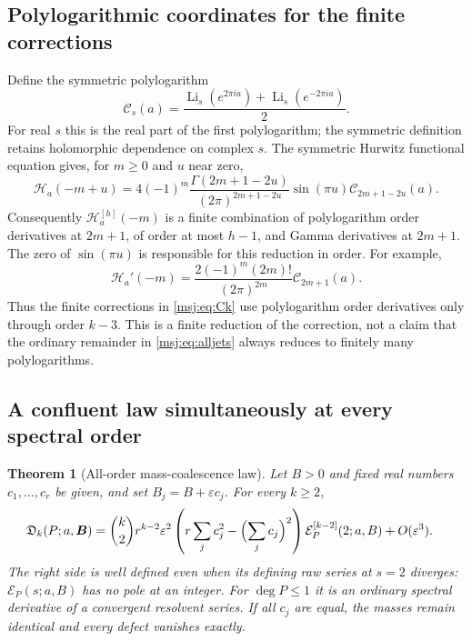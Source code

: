 \documentclass[11pt,a4paper]{article}
\numberwithin{equation}{section}
\theoremstyle{plain}
\newtheorem{theorem}{Theorem}[section]
\theoremstyle{definition}
\theoremstyle{remark}
\begin{document}
\subsection{Polylogarithmic coordinates for the finite corrections}

Define the symmetric polylogarithm
\[
 \mathcal C_s(a)=\frac{\operatorname{Li}_s(e^{2\pi ia})
                          +\operatorname{Li}_s(e^{-2\pi ia})}{2}.
\]
For real $s$ this is the real part of the first polylogarithm; the
symmetric definition retains holomorphic dependence on complex $s$.
The symmetric Hurwitz functional equation gives, for $m\ge0$ and
$u$ near zero,
\begin{equation}
 \mathcal H_a(-m+u)
 =4(-1)^m\frac{\Gamma(2m+1-2u)}{(2\pi)^{2m+1-2u}}
                  \sin(\pi u)\mathcal C_{2m+1-2u}(a).
 \label{msj:eq:H-polylog}
\end{equation}
Consequently $\mathcal H_a^{[h]}(-m)$ is a finite combination of
polylogarithm order derivatives at $2m+1$, of order at most $h-1$,
and Gamma derivatives at $2m+1$. The zero of $\sin(\pi u)$ is
responsible for this reduction in order. For example,
\begin{equation}
 \mathcal H_a'(-m)=
 \frac{2(-1)^m(2m)!}{(2\pi)^{2m}}\mathcal C_{2m+1}(a).
 \label{msj:eq:Hprime-polylog}
\end{equation}
Thus the finite corrections in \eqref{msj:eq:Ck} use polylogarithm
order derivatives only through order $k-3$. This is a finite reduction
of the correction, not a claim that the ordinary remainder in
\eqref{msj:eq:alljets} always reduces to finitely many polylogarithms.

\subsection{A confluent law simultaneously at every spectral order}

\begin{theorem}[All-order mass-coalescence law]
\label{msj:thm:allconfluent}
Let $B>0$ and fixed real numbers $c_1,\ldots,c_r$ be given, and set
$B_j=B+\varepsilon c_j$. For every $k\ge2$,
\begin{align}
 \mathfrak D_k(P;a,\boldsymbol B)
 &=\binom{k}{2}r^{k-2}\varepsilon^2
       \left(r\sum_jc_j^2-\Bigl(\sum_jc_j\Bigr)^2\right)
                    \mathcal E_P^{[k-2]}(2;a,B)
       +O(\varepsilon^3).
 \label{msj:eq:allconfluence}
\end{align}
The right side is well defined even when its defining raw series at
$s=2$ diverges: $\mathcal E_P(s;a,B)$ has no pole at an integer.
For $\deg P\le1$ it is an ordinary spectral derivative of a convergent
resolvent series. If all $c_j$ are equal, the masses remain identical
and every defect vanishes exactly.
\end{theorem}
\end{document}
